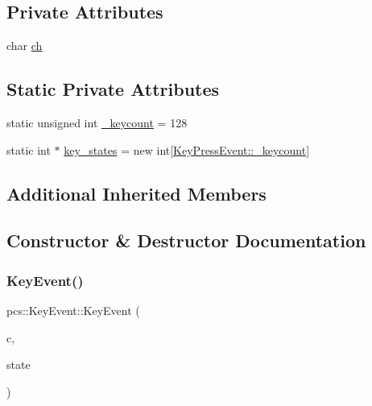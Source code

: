 \subsection*{Private Attributes}
\begin{DoxyCompactItemize}
\item 
char \hyperlink{classpcs_1_1KeyEvent_a583b56025e205125c2eae41f17e442e6}{ch}
\end{DoxyCompactItemize}
\subsection*{Static Private Attributes}
\begin{DoxyCompactItemize}
\item 
static unsigned int \hyperlink{classpcs_1_1KeyEvent_a4704e9758c494ee99e83226714b58412}{\+\_\+keycount} = 128
\item 
static int $\ast$ \hyperlink{classpcs_1_1KeyEvent_ade70c09116e673cc43d15721dea95965}{key\+\_\+states} = new int\mbox{[}\hyperlink{classpcs_1_1KeyEvent_a4704e9758c494ee99e83226714b58412}{Key\+Press\+Event\+::\+\_\+keycount}\mbox{]}
\end{DoxyCompactItemize}
\subsection*{Additional Inherited Members}


\subsection{Constructor \& Destructor Documentation}
\mbox{\label{classpcs_1_1KeyEvent_a238360a5576281a9d19a986a05cfd118}} 
\subsubsection{\texorpdfstring{Key\+Event()}{KeyEvent()}}
{\footnotesize\ttfamily pcs\+::\+Key\+Event\+::\+Key\+Event (\begin{DoxyParamCaption}\item[{const char}]{c,  }\item[{\hyperlink{namespacepcs_a74212420ef246b051e11d561089ed547}{Key\+State}}]{state }\end{DoxyParamCaption})}



